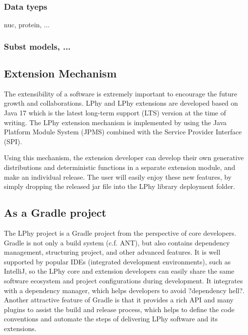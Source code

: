 \documentclass[10pt,letterpaper,table]{article}
\begin{document}
{\subsubsection{Data tyeps}

nuc, protein, ...

\subsubsection{Subst models, ...}




\subsection{Extension Mechanism}

The extensibility of a software is extremely important to encourage the future growth and collaborations. 
LPhy and LPhy extensions are developed based on Java 17 which is the latest long-term support (LTS) version at the time of writing. 
The LPhy extension mechanism is implemented by using the Java Platform Module System (JPMS) combined with the Service Provider Interface (SPI).

Using this mechanism, the extension developer can develop their own generative distributions and deterministic functions in a separate extension module, and make an individual release.
The user will easily enjoy these new features, by simply dropping the released jar file into the LPhy library deployment folder.

\subsection{As a Gradle project}

The LPhy project is a Gradle project from the perspective of core developers. Gradle is not only a build system (c.f. ANT), but also contains dependency management, structuring project, and other advanced features. 
It is well supported by popular IDEs (integrated development environments), such as IntelliJ, so the LPhy core and extension developers can easily share the same software ecosystem and project configurations during development. 
It integrates with a dependency manager, which helps developers to avoid ?dependency hell?. 
Another attractive feature of Gradle is that it provides a rich API and many plugins to assist the build and release process, 
which helps to define the code conventions and automate the steps of delivering LPhy software and its extensions.  

}
\end{document}
